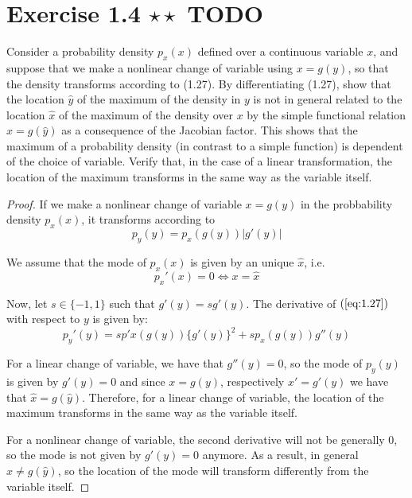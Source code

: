 \section*{Exercise 1.4 $\star \star$ TODO}
Consider a probability density $p_x(x)$ defined over a continuous variable
$x$, and suppose that we make a nonlinear change of variable using $x = g(y)$,
so that the density transforms according to (1.27). By differentiating (1.27),
show that the location  $\widehat{y}$ of the maximum of the density in
$y$ is not in general related to the location $\widehat{x}$ of the maximum of the
density over $x$ by the simple functional relation $\widehat{x} = g(\widehat{y})$ 
as a consequence of the Jacobian factor. This shows that the maximum of a probability
density (in contrast to a simple function) is dependent of the choice of variable.
Verify that, in the case of a linear transformation, the location of the maximum
transforms in the same way as the variable itself.

\vspace{1em}

\begin{proof}
    If we make a nonlinear change of variable $x = g(y)$ in the probbability density 
    $p_x(x)$, it transforms according to
    \begin{equation}\label{eq:1.27}\tag{1.27}
        p_y(y) = p_x(g(y)) |g'(y)|
    \end{equation}

    We assume that the mode of $p_x(x)$ is given by an unique $\widehat{x}$, i.e.
     \[
         p_x'(x) = 0 \iff x = \widehat{x}
    \] 

    Now, let $s \in \{-1, 1\}$ such that $g'(y) = sg'(y)$. 
    The derivative of  $(\ref{eq:1.27})$ with respect to $y$ is given by:
    \[
        p_y'(y) = sp'x(g(y))\{g'(y)\}^2 + sp_x(g(y))g''(y)
    \] 

    For a linear change of variable, we have that $g''(y) = 0$, so the mode of $p_y(y)$ 
    is given by $g'(y) = 0$ and since $x = g(y)$, respectively $x' = g'(y)$ we have that
    $\widehat{x} = g(\widehat{y})$. Therefore, for a linear change of variable, the location
    of the maximum transforms in the same way as the variable itself.

    For a nonlinear change of variable, the second derivative will not be generally 0, so
    the mode is not given by $g'(y) = 0$ anymore. As a result, in general $\widehat{x} \neq g(\widehat{y})$,
    so the location of the mode will transform differently from the variable itself.
\end{proof}

